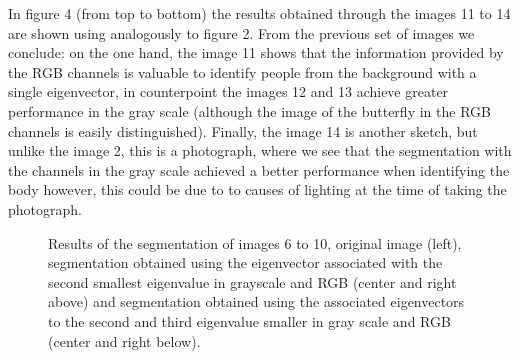 \documentclass[conference]{IEEEtran}
\theoremstyle{definition}
\begin{document}
\newpage
In figure 4 (from top to bottom) the results obtained through the images 11 to 14 are shown using analogously to figure 2. From the previous set of images we conclude: on the one hand, the image 11 shows that the information provided by the RGB channels is valuable to identify people from the background with a single eigenvector, in counterpoint the images 12 and 13 achieve greater performance in the gray scale (although the image of the butterfly in the RGB channels is easily distinguished). Finally, the image 14 is another sketch, but unlike the image 2, this is a photograph, where we see that the segmentation with the channels in the gray scale achieved a better performance when identifying the body however, this could be due to to causes of lighting at the time of taking the photograph.
\begin{figure}[htbp]
\caption{Results of the segmentation of images 6 to 10, original image (left), segmentation obtained using the eigenvector associated with the second smallest eigenvalue in grayscale and RGB (center and right above) and segmentation obtained using the associated eigenvectors to the second and third eigenvalue smaller in gray scale and RGB (center and right below).}
\label{res2}
\end{figure}
\FloatBarrier
\newpage
\end{document}
